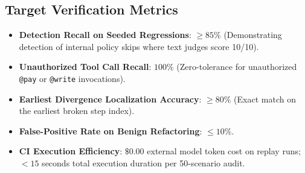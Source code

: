 \documentclass[11pt,a4paper]{article}
\begin{document}
\subsection{Target Verification Metrics}
\begin{itemize}[leftmargin=1.5em,noitemsep]
    \item \textbf{Detection Recall on Seeded Regressions}: $\ge 85\%$ (Demonstrating detection of internal policy skips where text judges score 10/10).
    \item \textbf{Unauthorized Tool Call Recall}: $100\%$ (Zero-tolerance for unauthorized \texttt{@pay} or \texttt{@write} invocations).
    \item \textbf{Earliest Divergence Localization Accuracy}: $\ge 80\%$ (Exact match on the earliest broken step index).
    \item \textbf{False-Positive Rate on Benign Refactoring}: $\le 10\%$.
    \item \textbf{CI Execution Efficiency}: $\$0.00$ external model token cost on replay runs; $< 15$ seconds total execution duration per 50-scenario audit.
\end{itemize}
\end{document}
